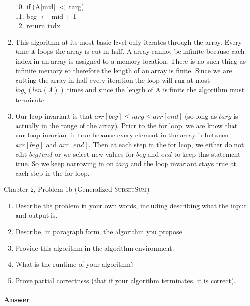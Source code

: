 \documentclass{article}
\begin{document}
\begin{enumerate}
\begin{algorithm}
    	10. \hspace{1.5em}	   if (A[mid] $<$ targ) \\
        11. \hspace{3.5em}        beg $\leftarrow$ mid + 1 \\
        12. return indx
    \end{algorithm}
    \item  This algorithm at its most basic level only iterates through the array. Every time it loops the array is cut in half. A array cannot be infinite because each index in an array is assigned to a memory location.  There is no such thing as infinite memory so therefore the length of an array is finite.  Since we are cutting the array in half every iteration the loop will run at most $log_2(len(A))$ times and since the length of A is finite the algorithm must terminate.
    \item Our loop invariant is that $arr[beg] \leq targ \leq arr[end]$ (so long as $targ$ is actually in the range of the array).
    Prior to the for loop, we are know that our loop invariant is true because every element in the array is between $arr[beg]$ and $arr[end]$.
    Then at each step in the for loop, we either do not edit $beg/end$ or we select new values for $beg$ and $end$ to keep this statement true.
    So we keep narrowing in on $targ$ and the loop invariant stays true at each step in the for loop.
\end{enumerate}


\nextprob
{}

Chapter 2, Problem 1b (Generalized \textsc{SubsetSum}).
\begin{enumerate}
    \item Describe the problem in your own words, including
        describing what the input and output is.
    \item Describe, in paragraph form, the algorithm you propose.
    \item Provide this algorithm in the algorithm environment.
    \item What is the runtime of your algorithm?
    \item Prove partial correctness (that if your algorithm terminates, it is
        correct).
\end{enumerate}


\paragraph{Answer}
\end{document}
